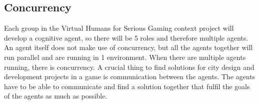 \newpage
\subsection{Concurrency}
Each group in the Virtual Humans for Serious Gaming context project will develop a cognitive agent, so there will be 5 roles and therefore multiple agents. An agent itself does not make use of concurrency, but all the agents together will run parallel and are running in 1 environment. When there are multiple agents running, there is concurrency. A crucial thing to find solutions for city design and development projects in a game is communication between the agents. The agents have to be able to communicate and find a solution together that fulfil the goals of the agents as much as possible.




